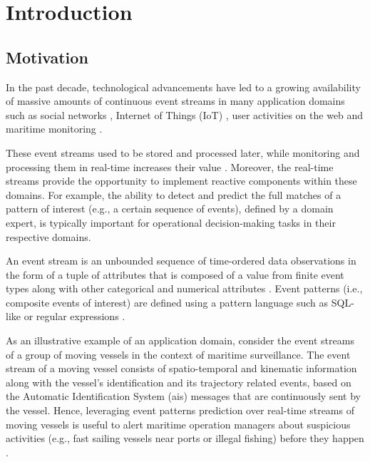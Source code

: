 \chapter{Introduction}

\section{Motivation}
\par In the past decade, technological advancements have led to a growing availability of massive amounts of continuous event streams in many application domains such as social networks \cite{reuter2012event,mathioudakis2010twittermonitor}, Internet of Things (IoT) \cite{miorandi2012internet}, user activities on the web \cite{banerjee2001clickstream,metwally2005duplicate} and maritime monitoring \cite{patroumpas2015event,laxhammar2010conformal}.

\par These event streams used to be stored and processed later, while monitoring and processing them in real-time increases their value \cite{carney2002monitoring}. Moreover, the real-time streams provide the opportunity to implement reactive components within these domains.  For example, the ability to detect and predict the full matches of a pattern of interest (e.g., a certain sequence of events), defined by a domain expert, is typically important for operational decision-making tasks in their respective domains.

\par An event stream is an unbounded sequence of time-ordered data observations in the form of a tuple of attributes that is composed of a value from finite event types along with other categorical and numerical attributes \cite{agrawal2008efficient,schultz2009distributed,zhou_pattern_2015,flouris2017issues}. Event patterns (i.e., composite events of interest) are defined using a pattern language such as SQL-like \cite{schultz2009distributed} or regular expressions \cite{alevizos2017event}.

\par As an illustrative example of an application domain, consider the event streams of a group of moving vessels in the context of maritime surveillance. The event stream of a moving vessel consists of spatio-temporal and kinematic information along with the vessel's identification and its trajectory related events, based on the Automatic Identification System (\ac{ais}) \cite{ais} messages that are continuously sent by the vessel. Hence, leveraging event patterns prediction over real-time streams of moving vessels is useful to alert maritime operation managers about suspicious activities (e.g., fast sailing vessels near ports or illegal fishing) before they happen \cite{patroumpas2015event}. 

